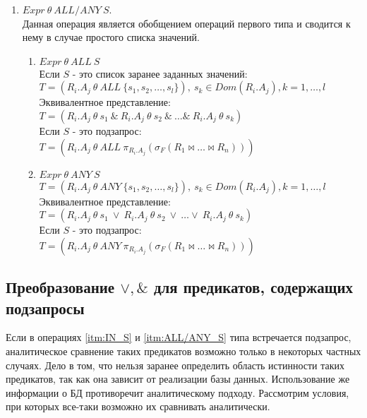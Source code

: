 \documentclass[10pt,a4paper]{article}
\def \n #1{\mathit{#1}}
\begin{document}
\begin{enumerate}
\item \label{itm:ALL/ANY_S} $\n{Expr}\ \theta\ \n{ALL/ANY}\ S$.\\
Данная операция является обобщением операций первого типа и сводится к нему в случае простого списка
значений.
\begin{enumerate}[label=\Roman*]
  \item $\n{Expr}\ \theta\ \n{ALL}\ S$\\ Если $S$ - это список заранее заданных значений:\\
  $T = (\n{R_i.A_j}\ \theta\ \n{ALL}\ \{s_1, s_2, \dots, s_l \}),\ s_k \in Dom(R_i.A_j), k = 1,
  \dots, l$\\  
  Эквивалентное представление:\\
  $T = (\n{R_i.A_j}\ \theta\ s_1\ \&\ \n{R_i.A_j}\ \theta\ s_2\ \&\ \dots \&\ \n{R_i.A_j}\ \theta\
  s_k)$\\
  Если $S$ - это подзапрос:\\
  $T = (\n{R_i.A_j}\ \theta\ \n{ALL}\ \pi_{R_i.A_j} (\sigma_F (R_1 \Join \dots \Join R_n)))$\\
  \item $\n{Expr}\ \theta\ \n{ANY}\ S$\\
  $T = (\n{R_i.A_j}\ \theta\ \n{ANY}\ \{s_1, s_2, \dots, s_l \}),\ s_k \in Dom(R_i.A_j), k = 1,
  \dots, l$\\  
  Эквивалентное представление:\\
  $T = (\n{R_i.A_j}\ \theta\ s_1\ \vee\ \n{R_i.A_j}\ \theta\ s_2\ \vee\ \dots \vee\ \n{R_i.A_j}\
  \theta\ s_k)$\\
  Если $S$ - это подзапрос:\\
  $T = (\n{R_i.A_j}\ \theta\ \n{ANY}\ \pi_{R_i.A_j} (\sigma_F (R_1 \Join \dots \Join R_n)))$\\
\end{enumerate}
\end{enumerate}

\subsection{Преобразование $\vee,\&$ для предикатов, содержащих подзапросы}
Если в операциях \ref{itm:IN_S} и \ref{itm:ALL/ANY_S} типа встречается подзапрос,
аналитическое сравнение таких предикатов возможно только в некоторых частных случаях. Дело в том,
что нельзя заранее определить область истинности таких предикатов, так как она зависит от реализации
базы данных. Использование же информации о БД противоречит аналитическому подходу. Рассмотрим
условия, при которых все-таки возможно их сравнивать аналитически.
\end{document}
